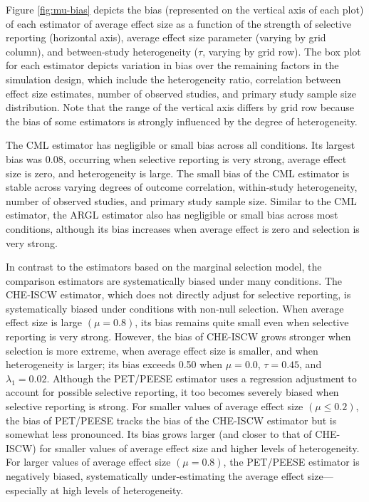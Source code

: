 \documentclass[
  american,
  man, donotrepeattitle,floatsintext]{apa7}
\begin{document}
Figure \ref{fig:mu-bias} depicts the bias (represented on the vertical axis of each plot) of each estimator of average effect size as a function of the strength of selective reporting (horizontal axis), average effect size parameter (varying by grid column), and between-study heterogeneity (\(\tau\), varying by grid row).
The box plot for each estimator depicts variation in bias over the remaining factors in the simulation design, which include the heterogeneity ratio, correlation between effect size estimates, number of observed studies, and primary study sample size distribution.
Note that the range of the vertical axis differs by grid row because the bias of some estimators is strongly influenced by the degree of heterogeneity.

The CML estimator has negligible or small bias across all conditions.
Its largest bias was 0.08, occurring when selective reporting is very strong, average effect size is zero, and heterogeneity is large.
The small bias of the CML estimator is stable across varying degrees of outcome correlation, within-study heterogeneity, number of observed studies, and primary study sample size.
Similar to the CML estimator, the ARGL estimator also has negligible or small bias across most conditions, although its bias increases when average effect is zero and selection is very strong.

In contrast to the estimators based on the marginal selection model, the comparison estimators are systematically biased under many conditions.
The CHE-ISCW estimator, which does not directly adjust for selective reporting, is systematically biased under conditions with non-null selection.
When average effect size is large \((\mu = 0.8)\), its bias remains quite small even when selective reporting is very strong.
However, the bias of CHE-ISCW grows stronger when selection is more extreme, when average effect size is smaller, and when heterogeneity is larger; its bias exceeds 0.50 when \(\mu = 0.0\), \(\tau = 0.45\), and \(\lambda_1 = 0.02\).
Although the PET/PEESE estimator uses a regression adjustment to account for possible selective reporting, it too becomes severely biased when selective reporting is strong.
For smaller values of average effect size \((\mu \leq 0.2)\), the bias of PET/PEESE tracks the bias of the CHE-ISCW estimator but is somewhat less pronounced. Its bias grows larger (and closer to that of CHE-ISCW) for smaller values of average effect size and higher levels of heterogeneity.
For larger values of average effect size \((\mu = 0.8)\), the PET/PEESE estimator is negatively biased, systematically under-estimating the average effect size---especially at high levels of heterogeneity.
\end{document}
